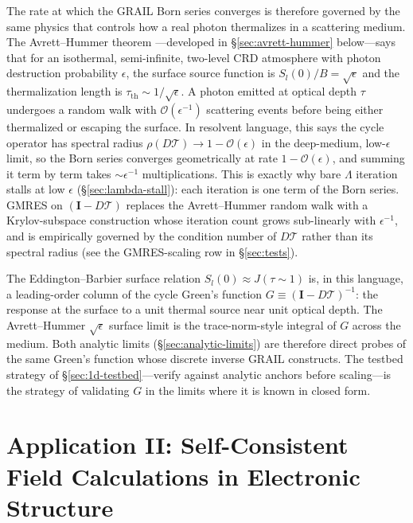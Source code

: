 \documentclass[11pt]{article}
\newcommand{\Tcyc}{\mathcal{T}}
\begin{document}
The rate at which the GRAIL Born series converges is therefore governed
by the same physics that controls how a real photon thermalizes in a
scattering medium.  The Avrett--Hummer theorem
\citep{AvrettHummer1965}---developed in \S\ref{sec:avrett-hummer}
below---says that for an isothermal, semi-infinite, two-level CRD
atmosphere with photon destruction probability $\epsilon$, the surface source
function is $S_l(0)/B = \sqrt{\epsilon}$ and the thermalization length
is $\tau_{\mathrm{th}} \sim 1/\sqrt{\epsilon}$.  A photon emitted at
optical depth $\tau$ undergoes a random walk with
$\mathcal{O}(\epsilon^{-1})$ scattering events before being either
thermalized or escaping the surface.  In resolvent language, this
says the cycle operator has spectral radius $\rho(D\Tcyc) \to 1 -
\mathcal{O}(\epsilon)$ in the deep-medium, low-$\epsilon$ limit, so
the Born series converges geometrically at rate $1 -
\mathcal{O}(\epsilon)$, and summing it term by term takes $\sim
\epsilon^{-1}$ multiplications.  This is exactly why bare $\Lambda$
iteration stalls at low $\epsilon$ (\S\ref{sec:lambda-stall}): each
iteration is one term of the Born series.  GMRES on $(\mathbf{I} -
D\Tcyc)$ replaces the Avrett--Hummer random walk with a Krylov-subspace
construction whose iteration count grows sub-linearly with
$\epsilon^{-1}$, and is empirically governed by the condition number
of $D\Tcyc$ rather than its spectral radius (see the GMRES-scaling
row in \S\ref{sec:tests}).

The Eddington--Barbier surface relation $S_l(0) \approx J(\tau \!
\sim \! 1)$ is, in this language, a leading-order column of the cycle
Green's function $G \equiv (\mathbf{I} - D\Tcyc)^{-1}$: the response
at the surface to a unit thermal source near unit optical depth.  The
Avrett--Hummer $\sqrt{\epsilon}$ surface limit is the trace-norm-style
integral of $G$ across the medium.  Both analytic limits
(\S\ref{sec:analytic-limits}) are therefore direct probes of the same
Green's function whose discrete inverse GRAIL constructs.  The
testbed strategy of \S\ref{sec:1d-testbed}---verify against analytic
anchors before scaling---is the strategy of validating $G$ in the
limits where it is known in closed form.

\section{Application II: Self-Consistent Field Calculations in Electronic Structure}
\label{sec:scf-testbed}
\end{document}
